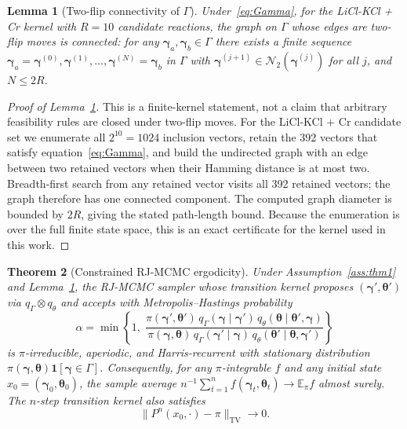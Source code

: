 \documentclass[12pt]{article}
\theoremstyle{plain}
\newtheorem{theorem}{Theorem}
\newtheorem{lemma}[theorem]{Lemma}
\theoremstyle{definition}
\theoremstyle{remark}
\newcommand{\E}{\mathbb{E}}
\newcommand{\norm}[1]{\lVert #1 \rVert}
\begin{document}
\begin{lemma}[Two-flip connectivity of $\Gamma$]\label{lem:connectivity}
Under~\eqref{eq:Gamma}, for the LiCl-KCl + Cr kernel with $R=10$
candidate reactions, the graph on $\Gamma$ whose edges are two-flip
moves is connected:  for any $\boldsymbol\gamma_a,\boldsymbol\gamma_b\in
\Gamma$ there exists a finite sequence
$\boldsymbol\gamma_a=\boldsymbol\gamma^{(0)},\boldsymbol\gamma^{(1)},
\ldots,\boldsymbol\gamma^{(N)}=\boldsymbol\gamma_b$ in $\Gamma$ with
$\boldsymbol\gamma^{(j+1)}\in\mathcal{N}_2(\boldsymbol\gamma^{(j)})$ for
all $j$, and $N\le 2R$.
\end{lemma}

\begin{proof}[Proof of Lemma~\ref{lem:connectivity}]
This is a finite-kernel statement, not a claim that arbitrary feasibility
rules are closed under two-flip moves.  For the LiCl-KCl + Cr candidate set
we enumerate all $2^{10}=1024$ inclusion vectors, retain the 392 vectors
that satisfy equation~\eqref{eq:Gamma}, and build the undirected graph with
an edge between two retained vectors when their Hamming distance is at most
two.  Breadth-first search from any retained vector visits all 392 retained
vectors; the graph therefore has one connected component.  The computed
graph diameter is bounded by $2R$, giving the stated path-length bound.
Because the enumeration is over the full finite state space, this is an
exact certificate for the kernel used in this work.
\end{proof}

\begin{theorem}[Constrained RJ-MCMC ergodicity]\label{thm:ergodicity}
Under Assumption~\ref{ass:thm1} and Lemma~\ref{lem:connectivity}, the
RJ-MCMC sampler whose transition kernel proposes
$(\boldsymbol\gamma',\boldsymbol\theta')$ via
$q_\Gamma\otimes q_\theta$ and accepts with Metropolis--Hastings
probability
\[
  \alpha = \min\!\left\{1,\;
    \frac{\pi(\boldsymbol\gamma',\boldsymbol\theta')\,
          q_\Gamma(\boldsymbol\gamma\mid\boldsymbol\gamma')\,
          q_\theta(\boldsymbol\theta\mid\boldsymbol\theta',\boldsymbol\gamma)}
         {\pi(\boldsymbol\gamma,\boldsymbol\theta)\,
          q_\Gamma(\boldsymbol\gamma'\mid\boldsymbol\gamma)\,
          q_\theta(\boldsymbol\theta'\mid\boldsymbol\theta,\boldsymbol\gamma')}
   \right\}
\]
is $\pi$-irreducible, aperiodic, and Harris-recurrent with stationary
distribution $\pi(\boldsymbol\gamma,\boldsymbol\theta)
\mathbf{1}[\boldsymbol\gamma\in\Gamma]$.  Consequently, for any
$\pi$-integrable $f$ and any initial state $x_0=(\boldsymbol\gamma_0,
\boldsymbol\theta_0)$, the sample average
$n^{-1}\sum_{t=1}^n f(\boldsymbol\gamma_t,\boldsymbol\theta_t)\to
\E_\pi f$ almost surely.  The $n$-step transition kernel also satisfies
\[
\norm{P^n(x_0,\cdot)-\pi}_{\mathrm{TV}}
\to 0 .
\]
\end{theorem}
\end{document}
